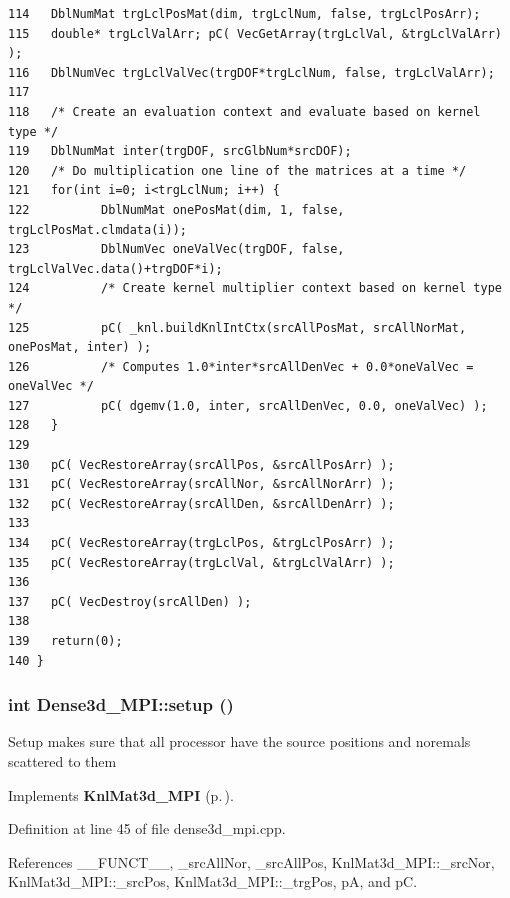 \begin{verbatim}
114   DblNumMat trgLclPosMat(dim, trgLclNum, false, trgLclPosArr);
115   double* trgLclValArr; pC( VecGetArray(trgLclVal, &trgLclValArr) );
116   DblNumVec trgLclValVec(trgDOF*trgLclNum, false, trgLclValArr);
117 
118   /* Create an evaluation context and evaluate based on kernel type */
119   DblNumMat inter(trgDOF, srcGlbNum*srcDOF);
120   /* Do multiplication one line of the matrices at a time */
121   for(int i=0; i<trgLclNum; i++) {
122          DblNumMat onePosMat(dim, 1, false, trgLclPosMat.clmdata(i));
123          DblNumVec oneValVec(trgDOF, false, trgLclValVec.data()+trgDOF*i);
124          /* Create kernel multiplier context based on kernel type */
125          pC( _knl.buildKnlIntCtx(srcAllPosMat, srcAllNorMat, onePosMat, inter) );
126          /* Computes 1.0*inter*srcAllDenVec + 0.0*oneValVec = oneValVec */
127          pC( dgemv(1.0, inter, srcAllDenVec, 0.0, oneValVec) );
128   }
129   
130   pC( VecRestoreArray(srcAllPos, &srcAllPosArr) );
131   pC( VecRestoreArray(srcAllNor, &srcAllNorArr) );
132   pC( VecRestoreArray(srcAllDen, &srcAllDenArr) );
133   
134   pC( VecRestoreArray(trgLclPos, &trgLclPosArr) );
135   pC( VecRestoreArray(trgLclVal, &trgLclValArr) );
136   
137   pC( VecDestroy(srcAllDen) );
138   
139   return(0);
140 }
\end{verbatim}\normalsize 


\subsubsection{\setlength{\rightskip}{0pt plus 5cm}int Dense3d\_\-MPI::setup ()\hspace{0.3cm}{\tt  [virtual]}}\label{classDense3d__MPI_415266b005d267e801176f27c0434a50_415266b005d267e801176f27c0434a50}


Setup makes sure that all processor have the source positions and noremals scattered to them 

Implements {\bf Knl\-Mat3d\_\-MPI} {\rm (p.\,\pageref{classKnlMat3d__MPI_98f7aa1beebfd344710d076d3d6413a2_98f7aa1beebfd344710d076d3d6413a2})}.

Definition at line 45 of file dense3d\_\-mpi.cpp.

References \_\-\_\-FUNCT\_\-\_\-, \_\-src\-All\-Nor, \_\-src\-All\-Pos, Knl\-Mat3d\_\-MPI::\_\-src\-Nor, Knl\-Mat3d\_\-MPI::\_\-src\-Pos, Knl\-Mat3d\_\-MPI::\_\-trg\-Pos, p\-A, and p\-C.

